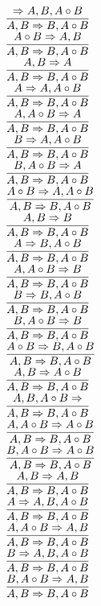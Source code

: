 \documentclass[11pt]{article}
\begin{document}
\begin{center}
\bigskip
\\$\infer{A, B\Rightarrow B, A\circ B}{\Rightarrow A, B, A\circ B}$
\bigskip
\\$\infer{A, B\Rightarrow B, A\circ B}{A\circ B\Rightarrow A, B}$
\bigskip
\\$\infer{A, B\Rightarrow B, A\circ B}{A, B\Rightarrow A}$
\bigskip
\\$\infer{A, B\Rightarrow B, A\circ B}{A\Rightarrow A, A\circ B}$
\bigskip
\\$\infer{A, B\Rightarrow B, A\circ B}{A, A\circ B\Rightarrow A}$
\bigskip
\\$\infer{A, B\Rightarrow B, A\circ B}{B\Rightarrow A, A\circ B}$
\bigskip
\\$\infer{A, B\Rightarrow B, A\circ B}{B, A\circ B\Rightarrow A}$
\bigskip
\\$\infer{A, B\Rightarrow B, A\circ B}{A\circ B\Rightarrow A, A\circ B}$
\bigskip
\\$\infer{A, B\Rightarrow B, A\circ B}{A, B\Rightarrow B}$
\bigskip
\\$\infer{A, B\Rightarrow B, A\circ B}{A\Rightarrow B, A\circ B}$
\bigskip
\\$\infer{A, B\Rightarrow B, A\circ B}{A, A\circ B\Rightarrow B}$
\bigskip
\\$\infer{A, B\Rightarrow B, A\circ B}{B\Rightarrow B, A\circ B}$
\bigskip
\\$\infer{A, B\Rightarrow B, A\circ B}{B, A\circ B\Rightarrow B}$
\bigskip
\\$\infer{A, B\Rightarrow B, A\circ B}{A\circ B\Rightarrow B, A\circ B}$
\bigskip
\\$\infer{A, B\Rightarrow B, A\circ B}{A, B\Rightarrow A\circ B}$
\bigskip
\\$\infer{A, B\Rightarrow B, A\circ B}{A, B, A\circ B\Rightarrow }$
\bigskip
\\$\infer{A, B\Rightarrow B, A\circ B}{A, A\circ B\Rightarrow A\circ B}$
\bigskip
\\$\infer{A, B\Rightarrow B, A\circ B}{B, A\circ B\Rightarrow A\circ B}$
\bigskip
\\$\infer{A, B\Rightarrow B, A\circ B}{A, B\Rightarrow A, B}$
\bigskip
\\$\infer{A, B\Rightarrow B, A\circ B}{A\Rightarrow A, B, A\circ B}$
\bigskip
\\$\infer{A, B\Rightarrow B, A\circ B}{A, A\circ B\Rightarrow A, B}$
\bigskip
\\$\infer{A, B\Rightarrow B, A\circ B}{B\Rightarrow A, B, A\circ B}$
\bigskip
\\$\infer{A, B\Rightarrow B, A\circ B}{B, A\circ B\Rightarrow A, B}$

\end{center}
\end{document}
